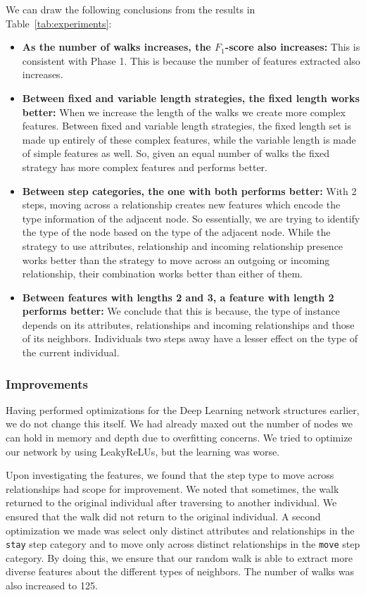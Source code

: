 \documentclass[runningheads,a4paper]{IEEEtran}
\begin{document}
We can draw the following conclusions from the results in Table~\ref{tab:experiments}:
\begin{itemize}
\item \textbf{As the number of walks increases, the $F_1$-score also increases:} This is consistent with Phase 1. This is because the number of features extracted also increases. 
\item \textbf{Between fixed and variable length strategies, the fixed length works better:} When we increase the length of the walks we create more complex features. Between fixed and variable length strategies, the fixed length set is made up entirely of these complex features, while the variable length is made of simple features as well. So, given an equal number of walks the fixed strategy has more complex features and performs better.
\item \textbf{Between step categories, the one with both performs better:} With 2 steps, moving across a relationship creates new features which encode the type information of the adjacent node. So essentially, we are trying to identify the type of the node based on the type of the adjacent node. While the strategy to use attributes, relationship and incoming relationship presence works better than the strategy to move across an outgoing or incoming relationship, their combination works better than either of them. 
\item \textbf{Between features with lengths 2 and 3, a feature with length 2 performs better:} We conclude that this is because, the type of instance depends on its attributes, relationships and incoming relationships and those of its neighbors. Individuals two steps away have a lesser effect on the type of the current individual.
\end{itemize}

\subsubsection{Improvements}
\label{refinement}
Having performed optimizations for the Deep Learning network structures earlier, we do not change this itself. We had already maxed out the number of nodes we can hold in memory and depth due to overfitting concerns. We tried to optimize our network by using LeakyReLUs\cite{maas2013rectifier}, but the learning was worse. 

Upon investigating the features, we found that the step type to move across relationships had scope for improvement. We noted that sometimes, the walk returned to the original individual after traversing to another individual. We ensured that the walk did not return to the original individual. A second optimization we made was select only distinct attributes and relationships in the \texttt{stay} step category and to move only across distinct relationships in the \texttt{move} step category. By doing this, we ensure that our random walk is able to extract more diverse features about the different types of neighbors. The number of walks was also increased to 125. 
\end{document}
